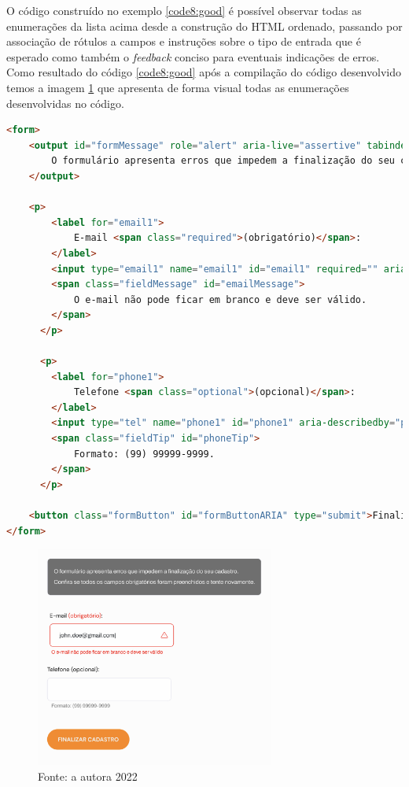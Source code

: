 { O código construído no exemplo \ref{code8:good} é possível observar todas as enumerações da lista acima desde a construção do HTML \cite{HTML} ordenado, passando por associação de rótulos a campos e instruções sobre o tipo de entrada que é esperado como também o \textit{feedback} conciso para eventuais indicações de erros. Como resultado do código \ref{code8:good} após a compilação do código desenvolvido temos a imagem \ref{fig5:code8} que apresenta de forma visual todas as enumerações desenvolvidas no código.
    
{\begin{lstlisting}[language=html, caption={Formulário acessível usando abordagens citadas acima}, label=code8:good]
<form>
    <output id="formMessage" role="alert" aria-live="assertive" tabindex="0" class="error">
        O formulário apresenta erros que impedem a finalização do seu cadastro. Confira se todos os campos obrigatórios foram preenchidos e tente novamente.
    </output>

    <p>
        <label for="email1">
            E-mail <span class="required">(obrigatório)</span>:
        </label>
        <input type="email1" name="email1" id="email1" required="" aria-invalid="true" aria-describedby="emailMessage">
        <span class="fieldMessage" id="emailMessage">
            O e-mail não pode ficar em branco e deve ser válido.
        </span>
      </p>

      <p>
        <label for="phone1">
            Telefone <span class="optional">(opcional)</span>:
        </label>
        <input type="tel" name="phone1" id="phone1" aria-describedby="phoneTip">
        <span class="fieldTip" id="phoneTip">
            Formato: (99) 99999-9999.
        </span>
      </p>

    <button class="formButton" id="formButtonARIA" type="submit">Finalizar cadastro</button>
</form>
\end{lstlisting}}

\begin{figure}[ht]
  	\center
    \includegraphics[width=0.7\textwidth]{images/form-acessivel.png}
    \caption{Exemplifica o código \ref{code8:good} após a compilação.}
    \caption*{Fonte: a autora 2022}
    \label{fig5:code8}
\end{figure} 
}
